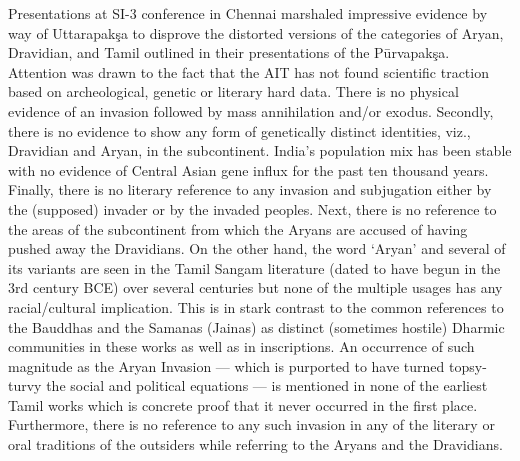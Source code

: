 Presentations at SI-3 conference in Chennai marshaled impressive evidence by way of Uttarapakşa to disprove the distorted versions of the categories of Aryan, Dravidian, and Tamil outlined in their presentations of the Pūrvapakşa. Attention was drawn to the fact that the AIT has not found scientific traction based on archeological, genetic or literary hard data. There is no physical evidence of an invasion followed by mass annihilation and/or exodus. Secondly, there is no evidence to show any form of genetically distinct identities, viz., Dravidian and Aryan, in the subcontinent. India’s population mix has been stable with no evidence of Central Asian gene influx for the past ten thousand years. Finally, there is no literary reference to any invasion and subjugation either by the (supposed) invader or by the invaded peoples. Next, there is no reference to the areas of the subcontinent from which the Aryans are accused of having pushed away the Dravidians. On the other hand, the word ‘Aryan’ and several of its variants are seen in the Tamil Sangam literature (dated to have begun in the 3rd century BCE) over several centuries but none of the multiple usages has any racial/cultural implication. This is in stark contrast to the common references to the Bauddhas and the Samanas (Jainas) as distinct (sometimes hostile) Dharmic communities in these works as well as in inscriptions. An occurrence of such magnitude as the Aryan Invasion — which is purported to have turned topsy-turvy the social and political equations — is mentioned in none of the earliest Tamil works which is concrete proof that it never occurred in the first place. Furthermore, there is no reference to any such invasion in any of the literary or oral traditions of the outsiders while referring to the Aryans and the Dravidians.

